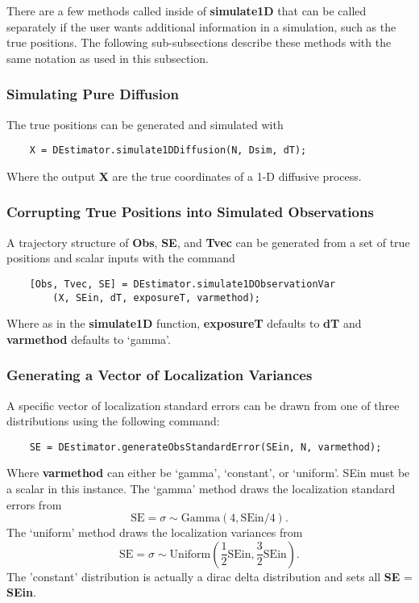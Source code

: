 \documentclass{article}
\begin{document}
There are a few methods called inside of \textbf{simulate1D} that can be called separately if the user wants additional information in a simulation, such as the true positions.  The following sub-subsections describe these methods with the same notation as used in this subsection.

\subsubsection{Simulating Pure Diffusion}
The true positions can be generated and simulated with
\begin{verbatim}
    X = DEstimator.simulate1DDiffusion(N, Dsim, dT);
\end{verbatim}
Where the output \textbf{X} are the true coordinates of a 1-D diffusive process.

\subsubsection{Corrupting True Positions into Simulated Observations}
A trajectory structure of \textbf{Obs}, \textbf{SE}, and \textbf{Tvec} can be generated from a set of true positions and scalar inputs with the command
\begin{verbatim}
    [Obs, Tvec, SE] = DEstimator.simulate1DObservationVar
        (X, SEin, dT, exposureT, varmethod);
\end{verbatim}
Where as in the \textbf{simulate1D} function, \textbf{exposureT} defaults to \textbf{dT} and \textbf{varmethod} defaults to `gamma'.

\subsubsection{Generating a Vector of Localization Variances}
A specific vector of localization standard errors can be drawn from one of three distributions using the following command:
\begin{verbatim}
    SE = DEstimator.generateObsStandardError(SEin, N, varmethod);
\end{verbatim}
Where \textbf{varmethod} can either be `gamma', `constant', or `uniform'.  SEin must be a scalar in this instance.  The `gamma' method draws the localization standard errors from $$\mathrm{SE}=\sigma\sim \mathrm{Gamma}(4,\mathrm{SEin}/4).$$  The `uniform' method draws the localization variances from $$\mathrm{SE}=\sigma\sim \mathrm{Uniform}(\frac{1}{2} \mathrm{SEin}, \frac{3}{2} \mathrm{SEin}).$$  The 'constant' distribution is actually a dirac delta distribution and sets all \textbf{SE} = \textbf{SEin}.
\end{document}
